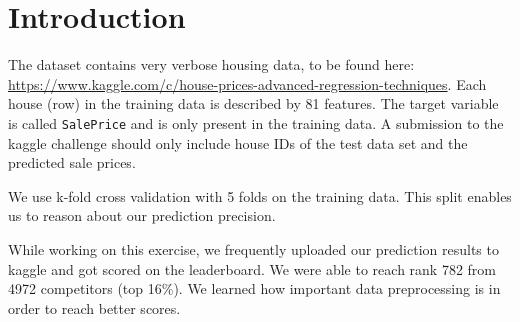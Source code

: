 \section{Introduction}

The dataset contains very verbose housing data, to be found here: \url{https://www.kaggle.com/c/house-prices-advanced-regression-techniques}. Each house (row) in the training data is described by 81 features. The target variable is called \texttt{SalePrice} and is only present in the training data. A submission to the kaggle challenge should only include house IDs of the test data set and the predicted sale prices. 

We use k-fold cross validation with 5 folds on the training data. This split enables us to reason about our prediction precision. 

While working on this exercise, we frequently uploaded our prediction results to kaggle and got scored on the leaderboard. We were able to reach rank 782 from 4972 competitors (top 16\%). We learned how important data preprocessing is in order to reach better scores.